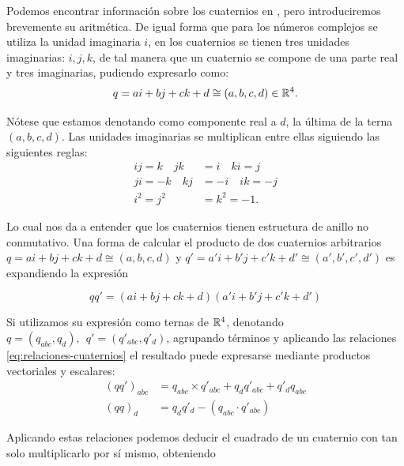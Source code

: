 Podemos encontrar información sobre los cuaternios en \cite{quaternions}, pero introduciremos brevemente su aritmética. De igual forma que para los números complejos se utiliza la unidad imaginaria $i$, en los cuaternios se tienen tres unidades imaginarias: $i,j,k$, de tal manera que un cuaternio se compone de una parte real y tres imaginarias, pudiendo expresarlo como:
\begin{equation}
    q = a i + b j + c k + d \cong (a,b,c,d)\in \mathbb{R}^4.
\end{equation}

Nótese que estamos denotando como componente real a $d$, la última de la terna $(a,b,c,d)$. Las unidades imaginarias se multiplican entre ellas siguiendo las siguientes reglas:
\begin{equation}
    \label{eq:relaciones-cuaternios}
    \begin{split}
        ij = k \quad jk &= i \quad ki = j \\
        ji = -k \quad kj &= -i \quad ik = -j \\
        i^2 = j^2 &= k^2 = -1. 
    \end{split}
\end{equation}

Lo cual nos da a entender que los cuaternios tienen estructura de anillo no conmutativo. Una forma de calcular el producto de dos cuaternios arbitrarios $q = a i + b j + c k + d\cong (a,b,c,d)$ y $q' = a' i + b' j + c'  k + d'\cong (a',b',c',d')$ es expandiendo la expresión

\begin{equation}
    qq' = (a i + b j + c k + d)(a' i + b' j + c' k + d') 
\end{equation}

Si utilizamos su expresión como ternas de $\mathbb{R}^4$, denotando $q=(q_{abc},q_d),  \  \ q'=(q'_{abc},q'_d)$, agrupando términos y aplicando las relaciones \ref{eq:relaciones-cuaternios} el resultado puede expresarse mediante productos vectoriales y escalares:
\begin{equation}
    \label{eq:producto-cuaternios}
    \begin{split}
        (qq')_{abc} &= q_{abc}\times q'_{abc} + q_d q'_{abc} + q'_d q_{abc} \\
        (qq)_d &= q_d q'_d - (q_{abc}\cdot q'_{abc})
    \end{split}
\end{equation}

Aplicando estas relaciones podemos deducir el cuadrado de un cuaternio con tan solo multiplicarlo por sí mismo, obteniendo

